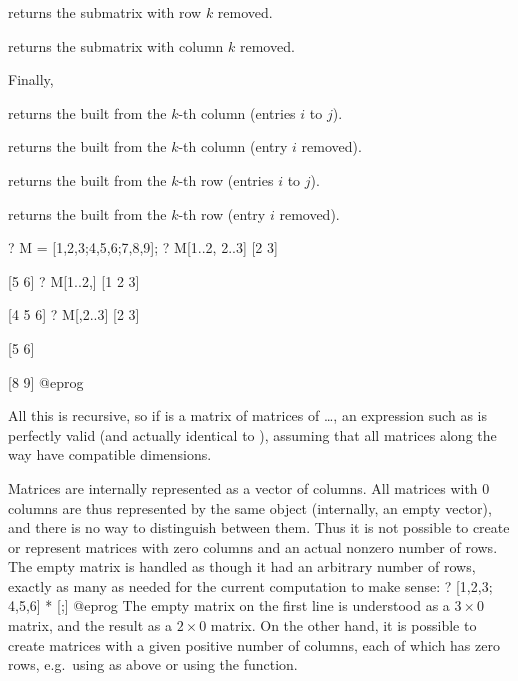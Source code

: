 \item {} returns the submatrix with row $k$ removed.

\item {} returns the submatrix with column $k$ removed.

\noindent Finally,

\item {} returns the  built from the $k$-th column
  (entries $i$ to $j$).

\item {} returns the  built from the $k$-th column
  (entry $i$ removed).

\item {} returns the  built from the $k$-th row
  (entries $i$ to $j$).

\item {} returns the  built from the $k$-th row
  (entry $i$ removed).

\bprog
? M = [1,2,3;4,5,6;7,8,9];
? M[1..2, 2..3]
[2 3]

[5 6]
? M[1..2,]
[1 2 3]

[4 5 6]
? M[,2..3]
[2 3]

[5 6]

[8 9]
@eprog

All this is recursive, so if  is a matrix of matrices of \dots, an
expression such as  is perfectly valid (and actually
identical to ), assuming that all matrices along the way
have compatible dimensions.

 Matrices are internally represented
as a vector of columns. All matrices with $0$ columns are thus represented
by the same object (internally, an empty vector), and there is no way to
distinguish between them. Thus it is not possible to create or represent
matrices with zero columns and an actual nonzero number of rows.
The empty matrix \kbd{[;]} is handled as though it had an arbitrary number of
rows, exactly as many as needed for the current computation to make sense:
\bprog
? [1,2,3; 4,5,6] * [;]
@eprog\noindent
The empty matrix on the first line is understood as a $3\times 0$ matrix, and
the result as a $2\times 0$ matrix. On the other hand, it is possible to
create matrices with a given positive number of columns, each of which has
zero rows, e.g.~using  as above or using the  function.

